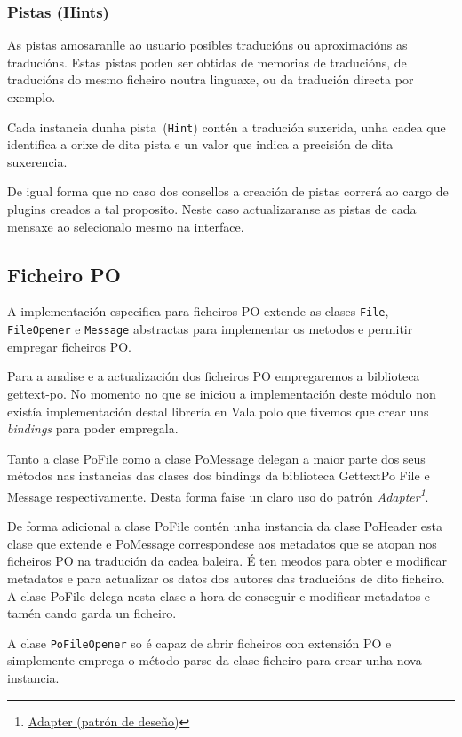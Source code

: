 \subsubsection{Pistas (Hints)}
As pistas amosaranlle ao usuario posibles traducións ou aproximacións as traducións. Estas pistas poden ser obtidas de memorias de traducións, de traducións do mesmo ficheiro noutra linguaxe, ou da tradución directa por exemplo.

Cada instancia dunha pista~(\lstinline{Hint}) contén a tradución suxerida, unha cadea que identifica a orixe de dita pista e un valor que indica a precisión de dita suxerencia.

De igual forma que no caso dos consellos a creación de pistas correrá ao cargo de plugins creados a tal proposito. Neste caso actualizaranse as pistas de cada mensaxe ao selecionalo mesmo na interface.

\subsection{Ficheiro PO}
A implementación especifica para ficheiros PO extende as clases \lstinline{File}, \lstinline{FileOpener} e \lstinline{Message} abstractas para implementar os metodos e permitir empregar ficheiros PO.

Para a analise e a actualización dos ficheiros PO empregaremos a biblioteca gettext-po. No momento no que se iniciou a implementación deste módulo non existía implementación destal librería en Vala polo que tivemos que crear uns \emph{bindings} para poder empregala.

Tanto a clase PoFile como a clase PoMessage delegan a maior parte dos seus métodos nas instancias das clases dos bindings da biblioteca GettextPo File e Message respectivamente. Desta forma faise un claro uso do patrón \emph{Adapter\footnote{\href{http://gl.wikipedia.org/wiki/Adapter_\%28patr\%C3\%B3n_de_dese\%C3\%B1o\%29}{Adapter (patrón de deseño)}}}.

De forma adicional a clase PoFile contén unha instancia da clase PoHeader esta clase que extende e PoMessage correspondese aos metadatos que se atopan nos ficheiros PO na tradución da cadea baleira. É ten meodos para obter e modificar metadatos e para actualizar os datos dos autores das traducións de dito ficheiro. A clase PoFile delega nesta clase a hora de conseguir e modificar metadatos e tamén cando garda un ficheiro.

A clase \lstinline{PoFileOpener} so é capaz de abrir ficheiros con extensión PO e simplemente emprega o método parse da clase ficheiro para crear unha nova instancia.

